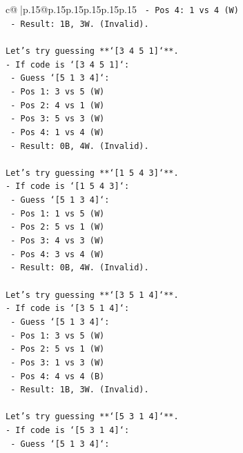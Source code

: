\documentclass{article}
\begin{document}
{\begin{supertabular}{c@{$\;$}|p{.15\linewidth}@{}p{.15\linewidth}p{.15\linewidth}p{.15\linewidth}p{.15\linewidth}p{.15\linewidth}}
{{{\texttt{        {-} Pos 4: 1 vs 4 (W)} \\
\texttt{        {-} Result: 1B, 3W. (Invalid).} \\
\\ 
\texttt{Let's try guessing **`{[}3 4 5 1{]}`**.} \\
\texttt{{-} If code is `{[}3 4 5 1{]}`:} \\
\texttt{    {-} Guess `{[}5 1 3 4{]}`:} \\
\texttt{        {-} Pos 1: 3 vs 5 (W)} \\
\texttt{        {-} Pos 2: 4 vs 1 (W)} \\
\texttt{        {-} Pos 3: 5 vs 3 (W)} \\
\texttt{        {-} Pos 4: 1 vs 4 (W)} \\
\texttt{        {-} Result: 0B, 4W. (Invalid).} \\
\\ 
\texttt{Let's try guessing **`{[}1 5 4 3{]}`**.} \\
\texttt{{-} If code is `{[}1 5 4 3{]}`:} \\
\texttt{    {-} Guess `{[}5 1 3 4{]}`:} \\
\texttt{        {-} Pos 1: 1 vs 5 (W)} \\
\texttt{        {-} Pos 2: 5 vs 1 (W)} \\
\texttt{        {-} Pos 3: 4 vs 3 (W)} \\
\texttt{        {-} Pos 4: 3 vs 4 (W)} \\
\texttt{        {-} Result: 0B, 4W. (Invalid).} \\
\\ 
\texttt{Let's try guessing **`{[}3 5 1 4{]}`**.} \\
\texttt{{-} If code is `{[}3 5 1 4{]}`:} \\
\texttt{    {-} Guess `{[}5 1 3 4{]}`:} \\
\texttt{        {-} Pos 1: 3 vs 5 (W)} \\
\texttt{        {-} Pos 2: 5 vs 1 (W)} \\
\texttt{        {-} Pos 3: 1 vs 3 (W)} \\
\texttt{        {-} Pos 4: 4 vs 4 (B)} \\
\texttt{        {-} Result: 1B, 3W. (Invalid).} \\
\\ 
\texttt{Let's try guessing **`{[}5 3 1 4{]}`**.} \\
\texttt{{-} If code is `{[}5 3 1 4{]}`:} \\
\texttt{    {-} Guess `{[}5 1 3 4{]}`:} \\
}}}
\end{supertabular}}
\end{document}
